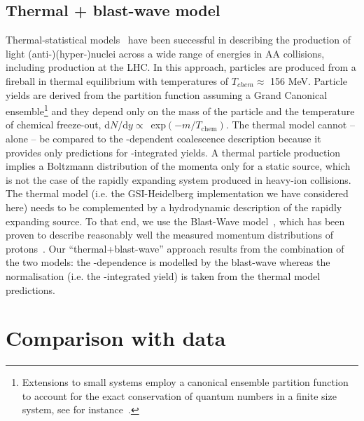 \documentclass{appolb}
\begin{document}
\subsection{Thermal + blast-wave model} 
Thermal-statistical models~\cite{Andronic:2010qu, Andronic:2017} have been successful in describing the production of light \mbox{(anti-)}(hyper-)nuclei across a wide range of energies in AA collisions, including production at the LHC. 
In this approach, particles are produced from a fireball in thermal equilibrium with temperatures of $T_{chem} \approx$ 156 MeV. 
Particle yields are derived from the partition function assuming a Grand Canonical ensemble\footnote{Extensions to small systems employ a canonical ensemble partition function to account for the exact conservation of quantum numbers in a finite size system, see for instance~\cite{Vovchenko:2018fiy}.} and they depend only on the mass of the particle and the temperature of chemical freeze-out, d$N$/d$y\propto$~exp$(-m/T_{\mathrm{chem}})$.
The thermal model cannot -- alone -- be compared to the \pt-dependent coalescence description because it provides only predictions for \pt-integrated yields. 
A thermal particle production implies a Boltzmann distribution of the momenta only for a static source, which is not the case of the rapidly expanding system produced in heavy-ion collisions. 
The thermal model (i.e. the GSI-Heidelberg implementation we have considered here) needs to be complemented by a hydrodynamic description of the rapidly expanding source. 
To that end, we use the Blast-Wave model~\cite{Schnedermann:1993ws}, which has been proven to describe reasonably well the measured momentum distributions of protons~\cite{Abelev:2013vea}. 
Our ``thermal+blast-wave'' approach results from the combination of the two models: the \pt-dependence is modelled by the blast-wave whereas the normalisation (i.e. the \pt-integrated yield) is taken from the thermal model predictions.



\section{Comparison with data} \label{sec:results}
\end{document}

